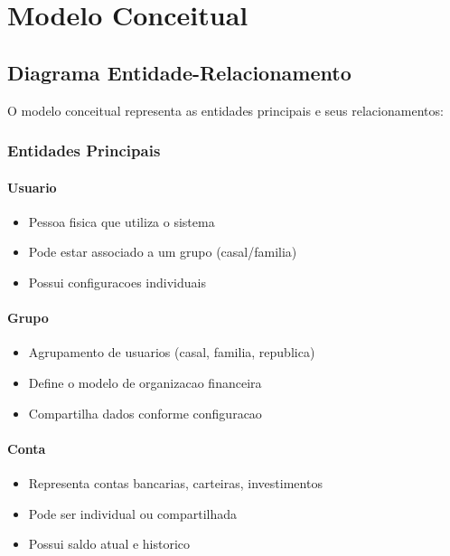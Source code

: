 \section{Modelo Conceitual}

\subsection{Diagrama Entidade-Relacionamento}

O modelo conceitual representa as entidades principais e seus relacionamentos:

\subsubsection{Entidades Principais}

\paragraph{Usuario}
\begin{itemize}
    \item Pessoa fisica que utiliza o sistema
    \item Pode estar associado a um grupo (casal/familia)
    \item Possui configuracoes individuais
\end{itemize}

\paragraph{Grupo}
\begin{itemize}
    \item Agrupamento de usuarios (casal, familia, republica)
    \item Define o modelo de organizacao financeira
    \item Compartilha dados conforme configuracao
\end{itemize}

\paragraph{Conta}
\begin{itemize}
    \item Representa contas bancarias, carteiras, investimentos
    \item Pode ser individual ou compartilhada
    \item Possui saldo atual e historico
\end{itemize}

